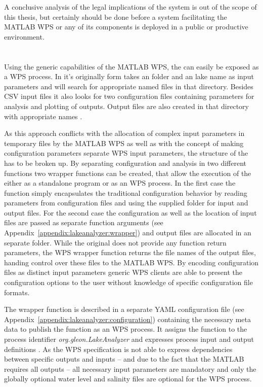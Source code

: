 		A conclusive analysis of the legal implications of the system is out of the scope of this thesis, but certainly should be done before a system facilitating the MATLAB WPS or any of its components is deployed in a public or productive environment.
	\section{\la}
		Using the generic capabilities of the MATLAB WPS, the \la can easily be exposed as a \ac{WPS} process. In it's originally form \la takes an folder and an lake name as input parameters and will search for appropriate named files in that directory. Besides CSV input files it also looks for two configuration files containing parameters for analysis and plotting of outputs. Output files are also created in that directory with appropriate names \citep{lamanual}.

		As this approach conflicts with the allocation of complex input parameters in temporary files by the MATLAB WPS as well as with the concept of making configuration parameters separate \ac{WPS} input parameters, the structure of the \la has to be broken up. By separating configuration and analysis in two different functions two wrapper functions can be created, that allow the execution of the \la either as a standalone program or as an WPS process. In the first case the function simply encapsulates the traditional configuration behavior by reading parameters from configuration files and using the supplied folder for input and output files. For the second case the configuration as well as the location of input files are passed as separate function arguments (see Appendix~\ref{appendix:lakeanalyzer:wrapper}) and output files are allocated in an separate folder. While the original \la does not provide any function return parameters, the WPS wrapper function returns the file names of the output files, handing control over these files to the MATLAB WPS. By encoding configuration files as distinct input parameters generic WPS clients are able to present the configuration options to the user without knowledge of specific configuration file formats.

		The wrapper function is described in a separate YAML configuration file (see Appendix~\ref{appendix:lakeanalyzer:configuration}) containing the necessary meta data to publish the function as an WPS process. It assigns the function to the process identifier \emph{org.gleon.LakeAnalyzer} and expresses process input and output definitions \citep[taken from the LakeAnalyzer user manual,][]{lamanual}. As the WPS specification is not able to express dependencies between specific outputs and inputs -- and due to the fact that the MATLAB requires all outputs -- all necessary input parameters are mandatory and only the globally optional water level and salinity files are optional for the WPS process.

